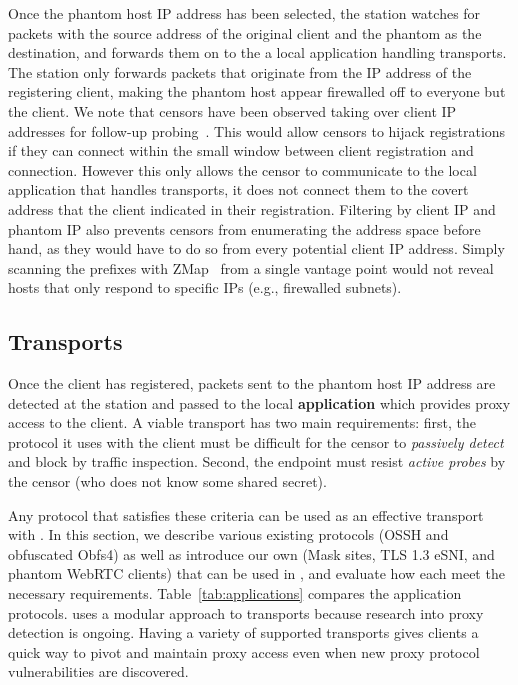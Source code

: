 \documentclass[sigconf]{acmart}
\begin{document}
Once the phantom host IP address has been selected, the station watches for
packets with the source address of the original client and the phantom as the destination, 
and forwards them on to the a local application handling transports. The station only 
forwards packets that originate from the IP address of the registering client, making the
 phantom host appear firewalled off to everyone but the client.
We note that censors have been observed taking over client IP
addresses for follow-up probing~\cite{ensafi-tor}. This would allow censors to
hijack registrations if they can connect within the small window between client 
registration and connection. However this only 
allows the censor to communicate to the local application that handles transports, 
it does not connect them to the covert address that the client indicated in their registration. 
Filtering by client IP and phantom IP also prevents censors from enumerating the
address space before hand, as they would have to do so from every potential
client IP address. Simply scanning the prefixes with ZMap~\cite{zmap13} from a
single vantage point would not reveal hosts that only respond to specific IPs
(e.g., firewalled subnets).


\subsection{Transports}


Once the client has registered, packets sent to the phantom host IP address are
detected at the station and passed to the local \textbf{application} which provides
proxy access to the client. A viable \scheme transport has
two main requirements: first, the protocol it uses with the client 
must be difficult for the censor to \emph{passively detect} and block by traffic
inspection. Second, the endpoint must resist \emph{active probes} by the censor (who
does not know some shared secret). 

Any protocol that satisfies these criteria can be used as an effective transport
with \scheme. In this section, we describe various existing protocols (OSSH and obfuscated Obfs4) as well
as introduce our own (Mask sites, TLS 1.3 eSNI, and phantom WebRTC clients) that
can be used in \scheme, and evaluate how each meet the necessary requirements.
Table~\ref{tab:applications} compares the application protocols. \scheme uses a modular 
approach to transports because research into proxy detection is ongoing.
Having a variety of supported transports gives clients a quick way to pivot and 
maintain proxy access even when new proxy protocol vulnerabilities are discovered.
\end{document}
